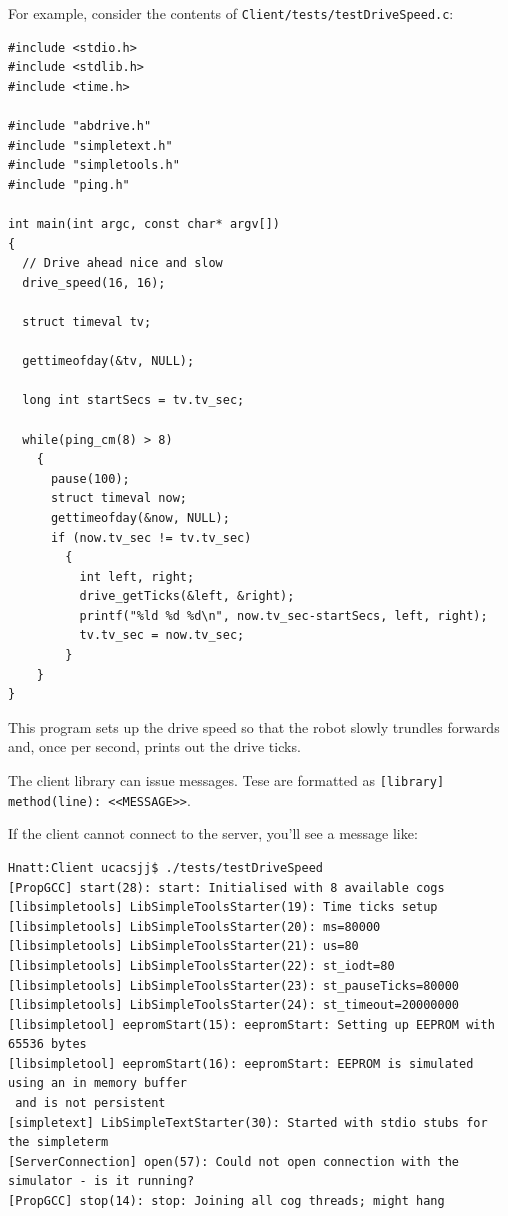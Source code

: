 \documentclass[a4paper]{article}
\begin{document}
For example, consider the contents of \verb+Client/tests/testDriveSpeed.c+:

\lstset{language=C++} 

\begin{verbatim}
#include <stdio.h>
#include <stdlib.h>
#include <time.h>

#include "abdrive.h"
#include "simpletext.h"
#include "simpletools.h"
#include "ping.h"

int main(int argc, const char* argv[])
{
  // Drive ahead nice and slow
  drive_speed(16, 16);

  struct timeval tv;
  
  gettimeofday(&tv, NULL);

  long int startSecs = tv.tv_sec;
  
  while(ping_cm(8) > 8)
    {
      pause(100);
      struct timeval now;
      gettimeofday(&now, NULL);
      if (now.tv_sec != tv.tv_sec)
        {
          int left, right;
          drive_getTicks(&left, &right);
          printf("%ld %d %d\n", now.tv_sec-startSecs, left, right);
          tv.tv_sec = now.tv_sec;
        }
    }
}
\end{verbatim}

This program sets up the drive speed so that the robot slowly trundles forwards and, once per second, prints out the drive ticks.

The client library can issue messages. Tese are formatted as \verb+[library] method(line): <<MESSAGE>>+.

If the client cannot connect to the server, you'll see a message like:

\begin{verbatim}
Hnatt:Client ucacsjj$ ./tests/testDriveSpeed 
[PropGCC] start(28): start: Initialised with 8 available cogs
[libsimpletools] LibSimpleToolsStarter(19): Time ticks setup
[libsimpletools] LibSimpleToolsStarter(20): ms=80000
[libsimpletools] LibSimpleToolsStarter(21): us=80
[libsimpletools] LibSimpleToolsStarter(22): st_iodt=80
[libsimpletools] LibSimpleToolsStarter(23): st_pauseTicks=80000
[libsimpletools] LibSimpleToolsStarter(24): st_timeout=20000000
[libsimpletool] eepromStart(15): eepromStart: Setting up EEPROM with 65536 bytes
[libsimpletool] eepromStart(16): eepromStart: EEPROM is simulated using an in memory buffer
 and is not persistent
[simpletext] LibSimpleTextStarter(30): Started with stdio stubs for the simpleterm
[ServerConnection] open(57): Could not open connection with the simulator - is it running?
[PropGCC] stop(14): stop: Joining all cog threads; might hang
\end{verbatim}
\end{document}
